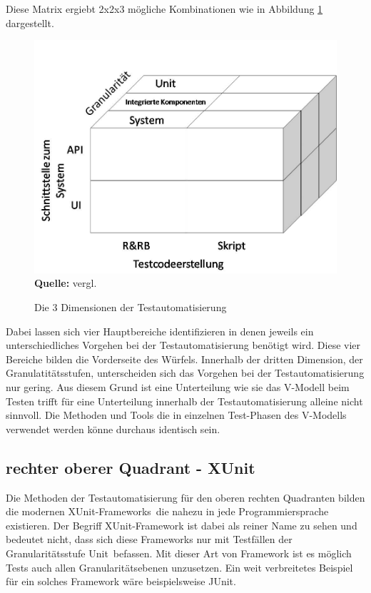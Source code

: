 Diese Matrix ergiebt 2x2x3 mögliche Kombinationen wie in Abbildung \ref{fig:3DimensionenDerTestauto} dargestellt.

\begin{figure}[htb]
  \centering  
  \includegraphics[scale=0.5]{img/methodenTestauto.jpg}\\
  \footnotesize\sffamily\textbf{Quelle:} vergl. \cite{meszaros_agile_2003}
  \caption{Die 3 Dimensionen der Testautomatisierung}
  \label{fig:3DimensionenDerTestauto}
\end{figure}

Dabei lassen sich vier Hauptbereiche identifizieren in denen jeweils ein unterschiedliches Vorgehen bei der Testautomatisierung benötigt wird. Diese vier Bereiche bilden die Vorderseite des Würfels. Innerhalb der dritten Dimension, der Granulatitätsstufen, unterscheiden sich das Vorgehen bei der Testautomatisierung nur gering. Aus diesem Grund ist eine Unterteilung wie sie das V-Modell beim Testen trifft für eine Unterteilung innerhalb der Testautomatisierung alleine nicht sinnvoll. Die Methoden und Tools die in einzelnen Test-Phasen des V-Modells verwendet werden könne durchaus identisch sein.

\subsection{rechter oberer Quadrant - XUnit}
Die Methoden der Testautomatisierung für den oberen rechten Quadranten bilden die modernen \glqq XUnit-Frameworks\grqq\ die nahezu in jede Programmiersprache existieren. Der Begriff XUnit-Framework ist dabei als reiner Name zu sehen und bedeutet nicht, dass sich diese Frameworks nur mit Testfällen der Granularitätsstufe \glqq Unit\grqq\ befassen. Mit dieser Art von Framework ist es möglich Tests auch allen Granularitätsebenen unzusetzen. Ein weit verbreitetes Beispiel für ein solches Framework wäre beispielsweise JUnit.

